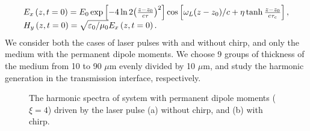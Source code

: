 \documentclass[10pt,letterpaper]{article}
\begin{document}
\begin{equation}
\begin{array}{l}
{E_x}\left( {z,t = 0} \right) = {E_0}\exp \left[ { - 4\ln 2{{\left( {\frac{{z - {z_0}}}{{c\tau }}} \right)}^2}} \right]\cos \left[ {{\omega _L}{{\left( {z - {z_0}} \right)} \mathord{\left/
			{\vphantom {{\left( {z - {z_0}} \right)} c}} \right.
			\kern-\nulldelimiterspace} c} + \eta \tanh \frac{{z - {z_0}}}{{c{\tau _c}}}} \right],\\
{H_y}\left( {z,t = 0} \right) = \sqrt {{{{\varepsilon _0}} \mathord{\left/
			{\vphantom {{{\varepsilon _0}} {{\mu _0}}}} \right.
			\kern-\nulldelimiterspace} {{\mu _0}}}} {E_x}\left( {z,t = 0} \right).
\end{array}
\label{eq20}
\end{equation}
We consider both the cases of laser pulses with and without chirp, and only the medium with the permanent dipole moments. We choose 9 groups of thickness of the medium from 10 to 90 $ \mu $m evenly divided by 10 $ \mu $m, and study the harmonic generation in the transmission interface, respectively.

\begin{figure}[!htbp]
\centering
{}
\caption{The harmonic spectra of system with permanent dipole moments ($ \xi=4 $) driven by the laser pulse (a) without chirp, and (b) with chirp.}
\label{fig6}
\end{figure}
\end{document}
